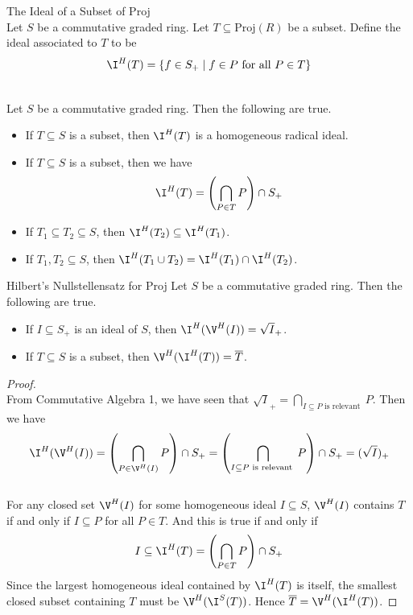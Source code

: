 \documentclass[a4paper]{article}
\begin{document}
\begin{defn}{The Ideal of a Subset of Proj}{}\\
Let $S$ be a commutative graded ring. Let $T\subseteq\text{Proj}(R)$ be a subset. Define the ideal associated to $T$ to be $$\I^H(T)=\{f\in S_+\;|\;f\in P\text{ for all }P\in T\}$$
\end{defn}

\begin{lmm}{}{}\\
Let $S$ be a commutative graded ring. Then the following are true. 
\begin{itemize}
\item If $T\subseteq S$ is a subset, then $\I^H(T)$ is a homogeneous radical ideal. 
\item If $T\subseteq S$ is a subset, then we have $$\I^H(T)=\left(\bigcap_{P\in T}P\right)\cap S_+$$
\item If $T_1\subseteq T_2\subseteq S$, then $\I^H(T_2)\subseteq\I^H(T_1)$. 
\item If $T_1,T_2\subseteq S$, then $\I^H(T_1\cup T_2)=\I^H(T_1)\cap\I^H(T_2)$. 
\end{itemize}
\end{lmm}

\begin{prp}{Hilbert's Nullstellensatz for Proj}{}
Let $S$ be a commutative graded ring. Then the following are true. 
\begin{itemize}
\item If $I\subseteq S_+$ is an ideal of $S$, then $\I^H(\V^H(I))=\sqrt{I}_+$. 
\item If $T\subseteq S$ is a subset, then $\V^H(\I^H(T))=\overline{T}$. 
\end{itemize}
\begin{proof}\\
From Commutative Algebra 1, we have seen that $\sqrt{I}_+=\bigcap_{I\subseteq P\text{ is relevant }}P$. Then we have $$\I^H(\V^H(I))=\left(\bigcap_{P\in\V^H(I)}P\right)\cap S_+=\left(\bigcap_{I\subseteq P\text{ is relevant }}P\right)\cap S_+=(\sqrt{I})_+$$~\\

For any closed set $\V^H(I)$ for some homogeneous ideal $I\subseteq S$, $\V^H(I)$ contains $T$ if and only if $I\subseteq P$ for all $P\in T$. And this is true if and only if $$I\subseteq\I^H(T)=\left(\bigcap_{P\in T}P\right)\cap S_+$$ Since the largest homogeneous ideal contained by $\I^H(T)$ is itself, the smallest closed subset containing $T$ must be $\V^H(\I^S(T))$. Hence $\overline{T}=\V^H(\I^H(T))$. 
\end{proof}
\end{prp}
\end{document}
